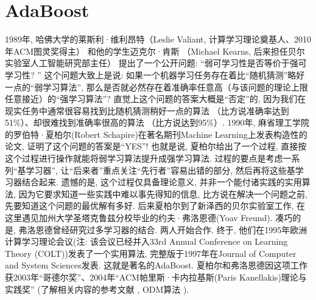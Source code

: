 \section{AdaBoost}
\begin{remark}
1989年, 哈佛大学的莱斯利·维利昂特（Leslie Valiant, 计算学习理论奠基人、2010年ACM图灵奖得主） 和他的学生迈克尔·肯斯 （Michael Kearns, 后来担任贝尔实验室人工智能研究部主任） 提出了一个公开问题: “弱可学习性是否等价于强可学习性? ”
这个问题大致上是说: 如果一个机器学习任务存在着比“随机猜测”略好一点的“弱学习算法”, 那么是否就必然存在着准确率任意高（与该问题的理论上限任意接近）的“强学习算法”?
直觉上这个问题的答案大概是“否定”的, 因为我们在现实任务中通常很容易找到比随机猜测稍好一点的算法 （比方说准确率达到51\%）、却很难找到准确率很高的算法 （比方说达到95\%）.
1990年, 麻省理工学院的罗伯特·夏柏尔(Robert Schapire)在著名期刊Machine Learning上发表构造性的论文, 证明了这个问题的答案是“YES”!
也就是说, 夏柏尔给出了一个过程, 直接按这个过程进行操作就能将弱学习算法提升成强学习算法. 过程的要点是考虑一系列“基学习器”, 让“后来者”重点关注“先行者”容易出错的部分, 然后再将这些基学习器结合起来.
遗憾的是, 这个过程仅具备理论意义, 并非一个能付诸实践的实用算法, 因为它要求知道一些实践中难以事先得知的信息, 比方说在解决一个问题之前, 先要知道这个问题的最优解有多好.
后来夏柏尔到了新泽西的贝尔实验室工作, 在这里遇见加州大学圣塔克鲁兹分校毕业的约夫·弗洛恩德(Yoav Freund). 凑巧的是, 弗洛恩德曾经研究过多学习器的结合. 两人开始合作.
终于, 他们在1995年欧洲计算学习理论会议(注: 该会议已经并入33rd Annual Conference on Learning Theory (COLT))发表了一个实用算法, 完整版于1997年在Journal of Computer and System Sciences发表. 这就是著名的AdaBoost.
夏柏尔和弗洛恩德因这项工作获2003年“哥德尔奖”、2004年“ACM帕里斯·卡内拉基斯(Paris Kanellakis)理论与实践奖” (了解相关内容的参考文献 \cite{Zhou978-3-319-11656-3-1}, ODM算法 \cite{Zhang2020-8638559,NIPS2019-9365}).
\end{remark}

